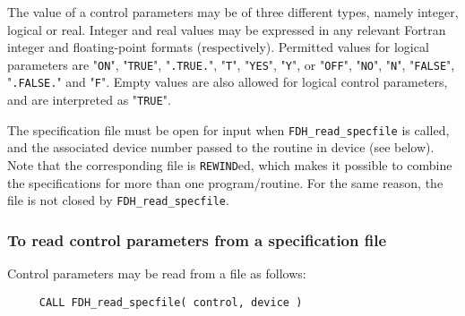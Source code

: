 \documentclass{galahad}
\newcommand{\packagename}{FDH}
\begin{document}
The value of a control parameters may be of three different types, namely
integer, logical or real.
Integer and real values may be expressed in any relevant Fortran integer and
floating-point formats (respectively). Permitted values for logical
parameters are "{\tt ON}", "{\tt TRUE}", "{\tt .TRUE.}", "{\tt T}",
"{\tt YES}", "{\tt Y}", or "{\tt OFF}", "{\tt NO}",
"{\tt N}", "{\tt FALSE}", "{\tt .FALSE.}" and "{\tt F}".
Empty values are also allowed for
logical control parameters, and are interpreted as "{\tt TRUE}".

The specification file must be open for
input when {\tt \packagename\_read\_specfile}
is called, and the associated device number
passed to the routine in device (see below).
Note that the corresponding
file is {\tt REWIND}ed, which makes it possible to combine the specifications
for more than one program/routine.  For the same reason, the file is not
closed by {\tt \packagename\_read\_specfile}.

\subsubsection{To read control parameters from a specification file}
\label{readspec}

Control parameters may be read from a file as follows:
\hskip0.5in
\def\baselinestretch{0.8} {\tt \begin{verbatim}
     CALL FDH_read_specfile( control, device )
\end{verbatim}
}
\def\baselinestretch{1.0}
\end{document}
